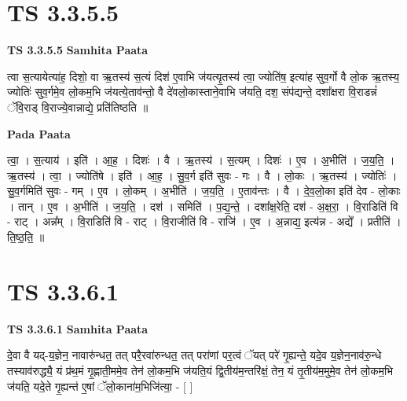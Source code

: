 \documentclass[17pt]{extarticle}
\begin{document}
\section*{ TS 3.3.5.5 }

\textbf{TS 3.3.5.5 } \newline
\textbf{Samhita Paata} \newline

त्वा स॒त्यायेत्या॑ह॒ दिशो॒ वा ऋ॒तस्य॑ स॒त्यं दिश॑ ए॒वाभि ज॑यत्यृ॒तस्य॑ त्वा॒ ज्योति॑ष॒ इत्या॑ह सुव॒र्गो वै लो॒क ऋ॒तस्य॒ ज्योतिः॑ सुव॒र्गमे॒व लो॒कम॒भि ज॑यत्ये॒ताव॑न्तो॒ वै दे॑वलो॒कास्ताने॒वाभि ज॑यति॒ दश॒ संप॑द्यन्ते॒ दशा᳚क्षरा वि॒राडन्नं॑ ॅवि॒राड् वि॒राज्ये॒वान्नाद्ये॒ प्रति॑तिष्ठति ॥ \newline

\textbf{Pada Paata} \newline

त्वा॒ । स॒त्याय॑ । इति॑ । आ॒ह॒ । दिशः॑ । वै । ऋ॒तस्य॑ । स॒त्यम् । दिशः॑ । ए॒व । अ॒भीति॑ । ज॒य॒ति॒ । ऋ॒तस्य॑ । त्वा॒ । ज्योति॑षे । इति॑ । आ॒ह॒ । सु॒व॒र्ग इति॑ सुवः - गः । वै । लो॒कः । ऋ॒तस्य॑ । ज्योतिः॑ । सु॒व॒र्गमिति॑ सुवः - गम् । ए॒व । लो॒कम् । अ॒भीति॑ । ज॒य॒ति॒ । ए॒ताव॑न्तः । वै । दे॒व॒लो॒का इति॑ देव - लो॒काः । तान् । ए॒व । अ॒भीति॑ । ज॒य॒ति॒ । दश॑ । समिति॑ । प॒द्य॒न्ते॒ । दशा᳚क्ष॒रेति॒ दश॑ - अ॒क्ष॒रा॒ । वि॒राडिति॑ वि - राट् । अन्न᳚म् । वि॒राडिति॑ वि - राट् । वि॒राजीति॑ वि - राजि॑ । ए॒व । अ॒न्नाद्य॒ इत्य॑न्न - अद्ये᳚ । प्रतीति॑ । ति॒ष्ठ॒ति॒ ॥  \newline




\section*{ TS 3.3.6.1 }

\textbf{TS 3.3.6.1 } \newline
\textbf{Samhita Paata} \newline

दे॒वा वै यद्-य॒ज्ञेन॒ नावारु॑न्धत॒ तत् परै॒रवा॑रुन्धत॒ तत् परा॑णां पर॒त्वं ॅयत् परे॑ गृ॒ह्यन्ते॒ यदे॒व य॒ज्ञेन॒नाव॑रु॒न्धे तस्याव॑रुद्ध्यै॒ यं प्र॑थ॒मं गृ॒ह्णाती॒ममे॒व तेन॑ लो॒कम॒भि ज॑यति॒यं द्वि॒तीय॑म॒न्तरि॑क्षं॒ तेन॒ यं तृ॒तीय॑म॒मुमे॒व तेन॑ लो॒कम॒भि ज॑यति॒ यदे॒ते गृ॒ह्यन्त॑ ए॒षां ॅलो॒काना॑म॒भिजि॑त्या॒ - [  ] \newline
\end{document}
